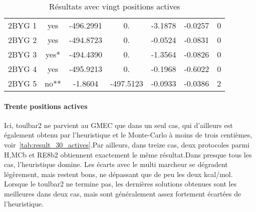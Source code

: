\begin{table}[h]
{\begin{tabular}{ccccccc}
        2BYG 1 & yes  & -496.2991 &  0.          & -3.1878 & -0.0257 & 0 \\        
        2BYG 2 & yes  & -494.8723 &  0.          & -0.0524 & -0.0831 & 0 \\        
        2BYG 3 & yes*  & -494.4390 &  0.          & -1.3564 & -0.0826 & 0 \\        
        2BYG 4 & yes  & -495.9213 &  0.          & -0.1968 & -0.6022 & 0 \\        
        2BYG 5 & no**   &  -1.8604   & -497.5123   & -0.0933 & -0.0386 & 2 \\   
       \bottomrule


 \end{tabular}
}   
 \caption{Résultats  avec vingt positions actives }
\label{tab:result_20_actives}   
\end{table}


   \paragraph{Trente positions actives}
Ici, toulbar2 ne parvient au GMEC que dans un seul cas, qui d'ailleurs est également obtenu par l'heuristique et le Monte-Carlo à moins de trois centièmes, voir~\ref{tab:result_30_actives}.Par ailleurs, dans treize cas, deux protocoles parmi H,MCb et RE8b2 obtiennent exactement le même résultat.Dans presque tous les cas, l'heuristique domine. Les écarts avec le multi marcheur se dégradent légèrement, mais restent bons, ne dépassant que de peu les deux kcal/mol. Lorsque le toulbar2 ne termine pas, les  dernières solutions obtenues sont les meilleures dans deux cas, mais sont généralement assez fortement écartées de l'heuristique.     


